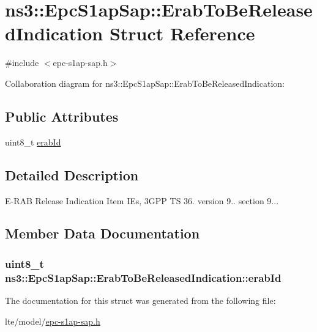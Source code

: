 \hypertarget{structns3_1_1EpcS1apSap_1_1ErabToBeReleasedIndication}{}\section{ns3\+:\+:Epc\+S1ap\+Sap\+:\+:Erab\+To\+Be\+Released\+Indication Struct Reference}
\label{structns3_1_1EpcS1apSap_1_1ErabToBeReleasedIndication}


{\ttfamily \#include $<$epc-\/s1ap-\/sap.\+h$>$}



Collaboration diagram for ns3\+:\+:Epc\+S1ap\+Sap\+:\+:Erab\+To\+Be\+Released\+Indication\+:
\subsection*{Public Attributes}
\begin{DoxyCompactItemize}
\item 
uint8\+\_\+t \hyperlink{structns3_1_1EpcS1apSap_1_1ErabToBeReleasedIndication_a200121c9d5726344b8146c18379f4f55}{erab\+Id}
\end{DoxyCompactItemize}


\subsection{Detailed Description}
E-\/\+R\+AB Release Indication Item I\+Es, 3\+G\+PP TS 36. version 9.. section 9... 

\subsection{Member Data Documentation}
\subsubsection[{\texorpdfstring{erab\+Id}{erabId}}]{\setlength{\rightskip}{0pt plus 5cm}uint8\+\_\+t ns3\+::\+Epc\+S1ap\+Sap\+::\+Erab\+To\+Be\+Released\+Indication\+::erab\+Id}\hypertarget{structns3_1_1EpcS1apSap_1_1ErabToBeReleasedIndication_a200121c9d5726344b8146c18379f4f55}{}\label{structns3_1_1EpcS1apSap_1_1ErabToBeReleasedIndication_a200121c9d5726344b8146c18379f4f55}


The documentation for this struct was generated from the following file\+:\begin{DoxyCompactItemize}
\item 
lte/model/\hyperlink{epc-s1ap-sap_8h}{epc-\/s1ap-\/sap.\+h}\end{DoxyCompactItemize}
